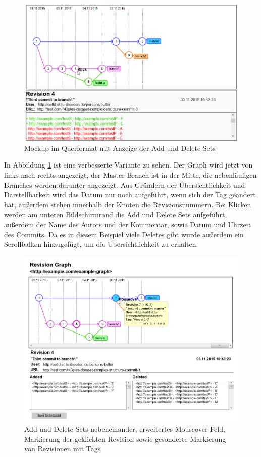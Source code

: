 \documentclass[nocolor]{tudbook}
\begin{document}
\begin{figure}
	\includegraphics[width=\textwidth]{Mockup_Querformat.png}
	\caption{Mockup im Querformat mit Anzeige der Add und Delete Sets}
	\label{fig:mockup2}
\end{figure}

In Abbildung \ref{fig:mockup2} ist eine verbesserte Variante zu sehen. Der Graph wird jetzt von links nach rechts angezeigt, der Master Branch ist in der Mitte, die nebenläufigen Branches werden darunter angezeigt. Aus Gründern der Übersichtlichkeit und Darstellbarkeit wird das Datum nur noch aufgeführt, wenn sich der Tag geändert hat, außerdem stehen innerhalb der Knoten die Revisionsnummern. Bei Klicken werden am unteren Bildschirmrand die Add und Delete Sets aufgeführt, außerdem der Name des Autors und der Kommentar, sowie Datum und Uhrzeit des Commits. Da es in diesem Beispiel viele Deletes gibt wurde außerdem ein Scrollbalken hinzugefügt, um die Übersichtlichkeit zu erhalten.

\begin{figure}
   \includegraphics[width=\textwidth]{Tooltip.png}
\caption{Add und Delete Sets nebeneinander, erweitertes Mouseover Feld, Markierung der geklickten Revision sowie gesonderte Markierung von Revisionen mit Tags}
\label{fig:mockup3}
\end{figure}
\end{document}
